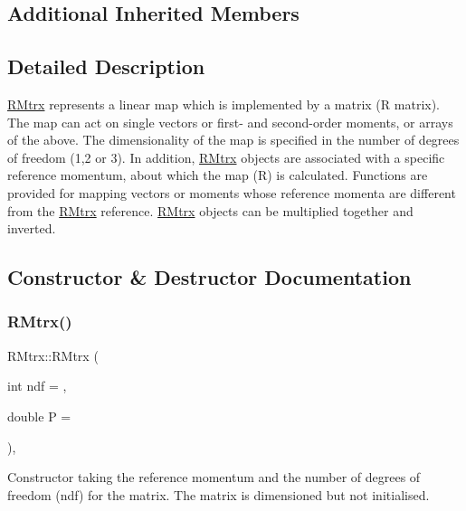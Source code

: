 \subsection*{Additional Inherited Members}


\subsection{Detailed Description}
\hyperlink{classRMtrx}{R\+Mtrx} represents a linear map which is implemented by a matrix (R matrix). The map can act on single vectors or first-\/ and second-\/order moments, or arrays of the above. The dimensionality of the map is specified in the number of degrees of freedom (1,2 or 3). In addition, \hyperlink{classRMtrx}{R\+Mtrx} objects are associated with a specific reference momentum, about which the map (R) is calculated. Functions are provided for mapping vectors or moments whose reference momenta are different from the \hyperlink{classRMtrx}{R\+Mtrx} reference. \hyperlink{classRMtrx}{R\+Mtrx} objects can be multiplied together and inverted. 

\subsection{Constructor \& Destructor Documentation}
\mbox{\label{classRMtrx_a032c49c9e214bc5547f1f8905b90c0a7}} 
\subsubsection{\texorpdfstring{R\+Mtrx()}{RMtrx()}\hspace{0.1cm}{\footnotesize\ttfamily [1/2]}}
{\footnotesize\ttfamily R\+Mtrx\+::\+R\+Mtrx (\begin{DoxyParamCaption}\item[{int}]{ndf = {},  }\item[{double}]{P = {} }\end{DoxyParamCaption})\hspace{0.3cm}{\ttfamily [inline]}, {\ttfamily [explicit]}}

Constructor taking the reference momentum and the number of degrees of freedom (ndf) for the matrix. The matrix is dimensioned but not initialised. \mbox{\label{classRMtrx_af3e573feaa7716ab2e3359d1ed5553e9}} 
